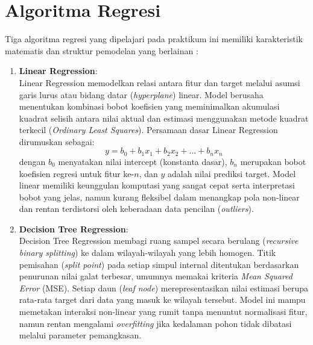 \documentclass[a4paper,oneside,12pt]{report}
\begin{document}
\section{Algoritma Regresi}
Tiga algoritma regresi yang dipelajari pada praktikum ini memiliki karakteristik matematis dan struktur pemodelan yang berlainan \cite{ref6}:

\begin{enumerate}
    \item \textbf{Linear Regression}: \\
    Linear Regression memodelkan relasi antara fitur dan target melalui asumsi garis lurus atau bidang datar (\textit{hyperplane}) linear. Model berusaha menentukan kombinasi bobot koefisien yang meminimalkan akumulasi kuadrat selisih antara nilai aktual dan estimasi menggunakan metode kuadrat terkecil (\textit{Ordinary Least Squares}). Persamaan dasar Linear Regression dirumuskan sebagai:
    \begin{equation}
        y = b_0 + b_1 x_1 + b_2 x_2 + \dots + b_n x_n
    \end{equation}
    dengan $b_0$ menyatakan nilai intercept (konstanta dasar), $b_n$ merupakan bobot koefisien regresi untuk fitur ke-$n$, dan $y$ adalah nilai prediksi target. Model linear memiliki keunggulan komputasi yang sangat cepat serta interpretasi bobot yang jelas, namun kurang fleksibel dalam menangkap pola non-linear dan rentan terdistorsi oleh keberadaan data pencilan (\textit{outliers}).

    \item \textbf{Decision Tree Regression}: \\
    Decision Tree Regression membagi ruang sampel secara berulang (\textit{recursive binary splitting}) ke dalam wilayah-wilayah yang lebih homogen. Titik pemisahan (\textit{split point}) pada setiap simpul internal ditentukan berdasarkan penurunan nilai galat terbesar, umumnya memakai kriteria \textit{Mean Squared Error} (MSE). Setiap daun (\textit{leaf node}) merepresentasikan nilai estimasi berupa rata-rata target dari data yang masuk ke wilayah tersebut. Model ini mampu memetakan interaksi non-linear yang rumit tanpa menuntut normalisasi fitur, namun rentan mengalami \textit{overfitting} jika kedalaman pohon tidak dibatasi melalui parameter pemangkasan.


\end{enumerate}
\end{document}
